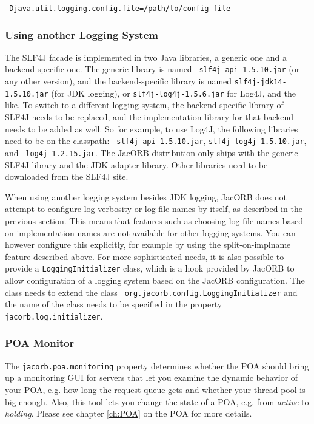 {{\begin{verbatim}
-Djava.util.logging.config.file=/path/to/config-file
\end{verbatim}

\subsubsection{Using another Logging System}

The SLF4J facade is implemented in two Java libraries, a generic one
and a backend-specific one.  The generic library is named {\tt
  slf4j-api-1.5.10.jar} (or any other version), and the
backend-specific library is named {\tt slf4j-jdk14-1.5.10.jar} (for JDK
logging), or {\tt slf4j-log4j-1.5.6.jar} for Log4J, and the like.  To
switch to a different logging system, the backend-specific library of
SLF4J needs to be replaced, and the implementation library for that
backend needs to be added as well.  So for example, to use Log4J, the
following libraries need to be on the classpath: {\tt
  slf4j-api-1.5.10.jar}, {\tt slf4j-log4j-1.5.10.jar}, and {\tt
  log4j-1.2.15.jar}.  The JacORB distribution only ships with the
generic SLF4J library and the JDK adapter library.  Other libraries
need to be downloaded from the SLF4J site.

When using another logging system besides JDK logging, JacORB does not
attempt to configure log verbosity or log file names by itself, as
described in the previous section.  This means that features such as
choosing log file names based on implementation names are not
available for other logging systems.  You can however configure this
explicitly, for example by using the split-on-implname feature
described above.  For more sophisticated needs, it is also possible to
provide a {\tt LoggingInitializer} class, which is a hook provided by
JacORB to allow configuration of a logging system based on the JacORB
configuration.  The class needs to extend the class {\tt
  org.jacorb.config.LoggingInitializer} and the name of the class
needs to be specified in the property {\tt jacorb.log.initializer}.

\subsubsection{POA Monitor}

The  {\tt jacorb.poa.monitoring} property  determines whether  the POA
should bring up a monitoring GUI  for servers that let you examine the
dynamic behavior of  your POA, e.g.  how long  the request queue gets
and whether your thread pool is  big enough.  Also, this tool lets you
change the  state of a POA,  e.g. from {\it active}  to {\it holding}.
Please see chapter \ref{ch:POA} on the POA for more details.

}}

